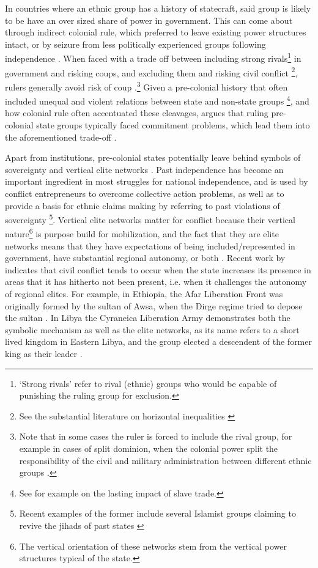 \documentclass[12pt]{article}
\begin{document}
In countries where an ethnic group has a history of statecraft, said group is
likely to be have an over sized share of power in government. This can come
about through indirect colonial rule, which preferred to leave existing power
structures intact, or by seizure from less politically experienced groups
following independence \citep{Paine2019}. When faced with a trade off between
including strong rivals\footnote{`Strong rivals' refer to rival (ethnic) groups
who would be capable of punishing the ruling group for exclusion.} in government
and risking coups, and excluding them and risking civil conflict \footnote{See
the substantial literature on horizontal inequalities \citep{CEDERMAN_2011}},
rulers generally avoid risk of coup \citep{Paine2019, Powell_2014,
	Roessler_2011}.\footnote{Note that in some cases the ruler is forced to
	include the rival group, for example in cases of split dominion, when
	the colonial power split the responsibility of the civil and military
	administration between different ethnic groups \citep{Paine2019}.} Given
	a pre-colonial history that often included unequal and violent relations
	between state and non-state groups \footnote{See for example
		\citet{Nunn2008} on the lasting impact of slave trade.}, and how
		colonial rule often accentuated these cleavages,
		\citet{Paine2019} argues that ruling pre-colonial state groups
		typically faced commitment problems, which lead them into the
		aforementioned trade-off \citep{Paine2019}.

Apart from institutions, pre-colonial states potentially leave behind symbols of
sovereignty and vertical elite networks \citep{Wishman}. Past independence has
become an important ingredient in most struggles for national independence, and
is used by conflict entrepreneurs to overcome collective action problems, as
well as to provide a basis for ethnic claims making by referring to past
violations of sovereignty \citep{Ahram2019, Shelef2016}\footnote{Recent examples
	of the former include several Islamist groups claiming to revive the
	jihads of past states \citep{Zenn2015}}. Vertical elite networks matter
	for conflict because their vertical nature\footnote{The vertical
		orientation of these networks stem from the vertical power
	structures typical of the state.} is purpose build for mobilization, and
	the fact that they are elite networks means that they have expectations
	of being included/represented in government, have substantial regional
	autonomy, or both \citep{Wishman}. Recent work by \citet{Ying_2020}
	indicates that civil conflict tends to occur when the state increases
	its presence in areas that it has hitherto not been present, i.e. when
	it challenges the autonomy of regional elites. For example, in Ethiopia,
	the Afar Liberation Front was originally formed by the sultan of Awsa,
	when the Dirge regime tried to depose the sultan \citep{Shehim1985,
	Hanfare2011}.  In Libya the Cyraneica Liberation Army demonstrates both
	the symbolic mechanism as well as the elite networks, as its name refers
	to a short lived kingdom in Eastern Libya, and the group elected a
	descendent of the former king as their leader \citep{Ahram2019}.
\end{document}
